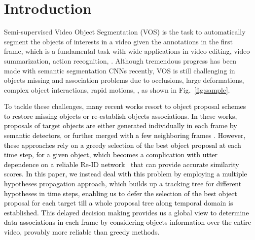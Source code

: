 \documentclass[10pt,twocolumn,letterpaper]{article}
\newcommand{\bao}[1]{\textcolor{black}{#1}}
\newcommand{\ldz}[1]{\textcolor{black}{#1}}
\begin{document}
\section{Introduction}



\let\thefootnote\relax{}
\let\thefootnote\relax{}


Semi-supervised Video Object Segmentation (VOS) is the task to automatically segment the objects of interests in a video given the annotations in the first frame, which is a fundamental task with wide applications in video editing, video summarization, action recognition, \etc. 
Although tremendous progress has been made with 
semantic segmentation CNNs \cite{long2015fully,chen2018deeplab, chen2018encoder,peng2017large} recently, VOS is still challenging in objects missing and association problems due to occlusions, large deformations, complex object interactions, rapid motions, \etc, as shown in Fig.~\ref{fig:sample}. 





To tackle these challenges, \bao{many recent works \cite{li2017video,sharir2017video,luiten2018premvos} resort to object proposal schemes \cite{he2017mask, ren2017faster} to restore missing objects or re-establish objects associations. 
In these works, proposals of target objects are either generated individually in each frame \cite{li2017video,sharir2017video} by semantic detectors, or further merged with a few neighboring frames  \cite{luiten2018premvos}. 
However, these approaches rely on a greedy selection of the best object proposal at each time step, for a given object, which becomes a complication with utter dependence on a reliable Re-ID  network~\cite{luiten2018premvos} that can provide accurate similarity scores. 
In this paper, we instead deal with this problem by employing a multiple hypotheses propagation approach, \ldz{which builds up a tracking tree for different hypotheses in time steps}, enabling us to defer the selection of the best object proposal for each target till a whole proposal tree along temporal domain is established. This delayed decision making provides us a global view to determine data associations in each frame by considering objects information over the entire video, provably more reliable than greedy methods.}
\end{document}
